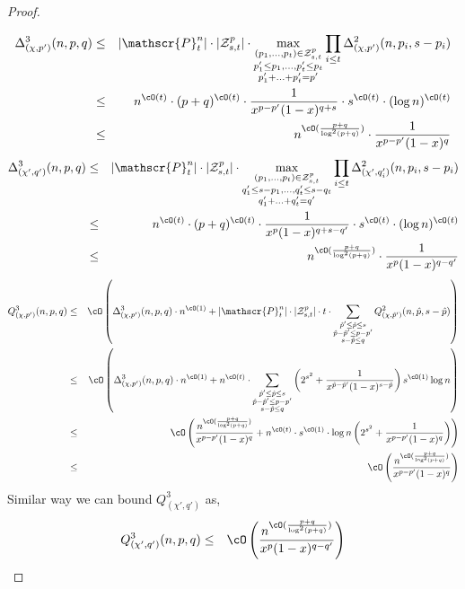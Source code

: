 \begin{proof}
\begin{eqnarray*}
\end{eqnarray*}
\begin{eqnarray*}
\Delta_{(\chi,p')}^3(n,p,q) &\leq& |\mathscr{P}_t^n|\cdot |{\cal Z}_{s,t}^{p}| \cdot 
\max_{\substack{(p_1,\ldots,p_t) \in {\cal Z}_{s,t}^{p} \\ p_1'\leq p_1,\ldots, p_t'\leq p_t \\ p_1'+\ldots+p_t'=p'}} \prod_{i \leq t}  \Delta_{(\chi,p')}^2(n,p_i,s-p_i)\\
&\leq& n^{\cO(t)}\cdot (p+q)^{\cO(t)} \cdot\frac{1}{x^{p-p'}(1-x)^{q+s}}\cdot s^{\cO(t)}\cdot (\log n)^{\cO(t)}\\
&\leq& n^{\cO(\frac{p+q}{\log^2(p+q)})}\cdot \frac{1}{x^{p-p'}(1-x)^{q}}\\
\end{eqnarray*}
\begin{eqnarray*}
\Delta_{(\chi',q')}^3(n,p,q) &\leq& |\mathscr{P}_t^n|\cdot |{\cal Z}_{s,t}^{p}| \cdot 
\max_{\substack{(p_1,\ldots,p_t) \in {\cal Z}_{s,t}^{p} \\ q_1'\leq s-p_1,\ldots, q_t'\leq s-q_t \\ q_1'+\ldots+q_t'=q'}} \prod_{i \leq t}  \Delta_{(\chi',q_i')}^2(n,p_i,s-p_i)\\
&\leq& n^{\cO(t)}\cdot (p+q)^{\cO(t)}\cdot \frac{1}{x^{p}(1-x)^{q+s-q'}}\cdot s^{\cO(t)}\cdot (\log n)^{\cO(t)}\\
&\leq& n^{\cO(\frac{p+q}{\log^2(p+q)})}\cdot \frac{1}{x^{p}(1-x)^{q-q'}}\\
\end{eqnarray*}
\begin{eqnarray*}
Q_{(\chi,p')}^3(n,p,q) &\leq& \cO\left(\Delta_{(\chi,p')}^3(n,p,q) \cdot n^{\cO(1)} + 
|\mathscr{P}_{t}^{n}|\cdot |{\cal Z}_{s,t}^{p}| \cdot t \cdot 
\sum_{\substack{ \hat{p}'\leq \hat{p}\leq s \\ \hat{p}-\hat{p}'\leq p-p' \\ s-\hat{p}\leq q }} Q_{(\chi,\hat{p}')}^2(n,\hat{p},s-\hat{p}) \right)\\
 &\leq& \cO\left(\Delta_{(\chi,p')}^3(n,p,q) \cdot n^{\cO(1)} + n^{\cO(t)} \cdot 
\sum_{\substack{ \hat{p}'\leq \hat{p}\leq s \\ \hat{p}-\hat{p}'\leq p-p' \\ s-\hat{p}\leq q }} \left(2^{s^2}+\frac{1}{x^{\hat{p}-\hat{p}'}(1-x)^{s-\hat{p}}}\right)s^{\cO(1)} \log n \right)\\
 &\leq& \cO\left(\frac{n^{\cO(\frac{p+q}{\log^2(p+q)})}}{x^{p-p'}(1-x)^{q}} + n^{\cO(t)} \cdot s^{\cO(1)}\cdot \log n
\left(2^{s^2}+\frac{1}{x^{p-p'}(1-x)^{q}}\right)  \right)\\
 &\leq& \cO\left(\frac{n^{\cO(\frac{p+q}{\log^2(p+q)})}}{x^{p-p'}(1-x)^{q}}  \right)\\
\end{eqnarray*}
Similar way we can bound $Q_{(\chi',q')}^3$ as,
\begin{eqnarray*}
 Q_{(\chi',q')}^3(n,p,q) &\leq& \cO\left(\frac{n^{\cO(\frac{p+q}{\log^2(p+q)})}}{x^{p}(1-x)^{q-q'}}  \right)
\end{eqnarray*}




\end{proof}
